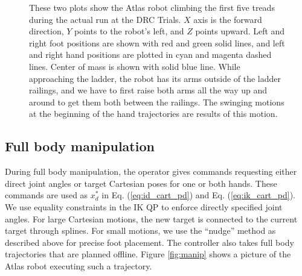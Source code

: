 \documentclass{ws-ijhr}
\newcommand{\eref}[1] {Eq. (\ref{#1})}
\newcommand{\fref}[1] {Figure \ref{#1}}
\begin{document}
\begin{figure}
  \begin{center}
    \caption{
      These two plots show the Atlas robot climbing the first five treads during
      the actual run at the DRC Trials. 
      $X$ axis is the forward direction, $Y$ points to the robot's left, and
      $Z$ points upward. 
      Left and right foot positions are shown with red
      and green solid lines, and left and right hand positions are plotted in
      cyan and magenta dashed lines. Center of mass is shown with solid blue 
      line. While approaching the ladder, the robot has its arms outside of
      the ladder railings, and we have to first raise both arms all the way up 
      and around to get them both between the railings. The swinging motions at
      the beginning of the hand trajectories are results of this motion. 
      }\label{fig:ladder_data} 
  \end{center}
\end{figure}

\subsection{Full body manipulation}
During full body manipulation, the operator gives commands requesting either 
direct joint angles or target Cartesian poses for one or both hands. 
These commands are used as $x^*_d$ in \eref{eq:id_cart_pd} and \eref{eq:ik_cart_pd}.
We use equality constraints in the IK QP to enforce 
directly specified joint angles. 
For large Cartesian motions, the new target is connected to the current target
through splines. 
For small motions, we use the ``nudge'' method as described above for precise 
foot placement.
The controller also takes full body trajectories that are planned offline.
\fref{fig:manip} shows a picture of the Atlas robot executing such a trajectory.
\end{document}
